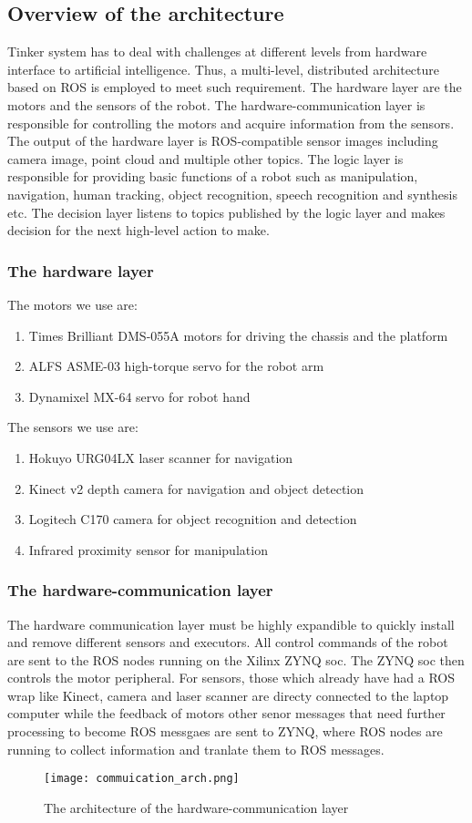 \subsection{Overview of the architecture}
Tinker system has to deal with challenges at different levels from hardware interface to artificial intelligence. Thus, a multi-level, distributed architecture based on ROS is employed to meet such requirement. The hardware layer are the motors and the sensors of the robot. The hardware-communication layer is responsible for controlling the motors and acquire information from the sensors. The output of the hardware layer is ROS-compatible sensor images including camera image, point cloud and multiple other topics. The logic layer is responsible for providing basic functions of a robot such as manipulation, navigation, human tracking, object recognition, speech recognition and synthesis etc. The decision layer listens to topics published by the logic layer and makes decision for the next high-level action to make.
\subsubsection{The hardware layer}
The motors we use are:
\begin{enumerate}
    \item Times Brilliant DMS-055A motors for driving the chassis and the platform
    \item ALFS ASME-03 high-torque servo for the robot arm
    \item Dynamixel MX-64 servo for robot hand
\end{enumerate}
The sensors we use are:
\begin{enumerate}
    \item Hokuyo URG04LX laser scanner for navigation
    \item Kinect v2 depth camera for navigation and object detection
    \item Logitech C170 camera for object recognition and detection
    \item Infrared proximity sensor for manipulation
\end{enumerate}
\subsubsection{The hardware-communication layer}
The hardware communication layer must be highly expandible to quickly install and remove different sensors and executors. All control commands of the robot are sent to the ROS nodes running on the Xilinx ZYNQ soc. The ZYNQ soc then controls the motor peripheral. 
For sensors, those which already have had a ROS wrap like Kinect, camera and laser scanner are directy connected to the laptop computer while the feedback of motors other senor messages that need further processing to become ROS messgaes are sent to ZYNQ, where ROS nodes are running to collect information and tranlate them to ROS messages.
\begin{figure}[H]
    \texttt{[image: commuication\_arch.png]}
    \caption{The architecture of the hardware-communication layer}
\end{figure}

